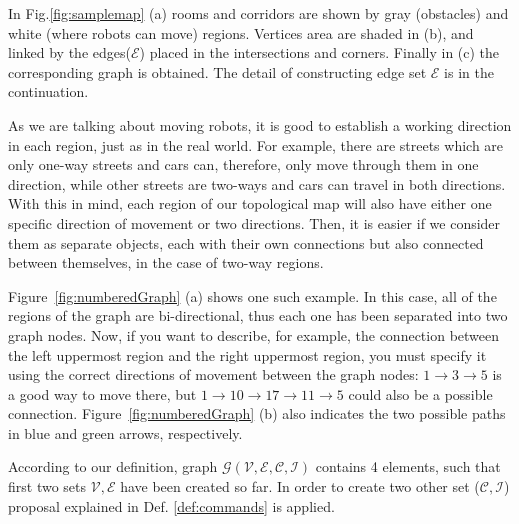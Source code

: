 \documentclass[twocolumn]{svjour3}       %
\begin{document}
%
In Fig.\ref{fig:samplemap} (a) rooms and corridors are shown by gray (obstacles) and white (where robots can move) regions. Vertices area are shaded in (b), and linked by the edges($\mathcal{E}$) placed in the intersections and corners. Finally in (c) the corresponding graph is obtained. The detail of constructing edge set $\mathcal{E}$ is in the continuation.

As we are talking about moving robots, it is good to establish a working direction in each region, just as in the real world. For example, there are streets which are only one-way streets and cars can, therefore, only move through them in one direction, while other streets are two-ways and cars can travel in both directions. With this in mind, each region of our topological map will also have either one specific direction of movement or two directions. Then, it is easier if we consider them as separate objects, each with their own connections but also connected between themselves, in the case of two-way regions.

Figure~\ref{fig:numberedGraph} (a) shows one such example. In this case, all of the regions of the graph are bi-directional, thus each one has been separated into two graph nodes. Now, if you want to describe, for example, the connection between the left uppermost region and the right uppermost region, you must specify it using the correct directions of movement between the graph nodes: $1 \rightarrow 3 \rightarrow 5$ is a good way to move there, but $1 \rightarrow 10 \rightarrow 17 \rightarrow 11 \rightarrow 5$ could also be a possible connection. Figure~\ref{fig:numberedGraph} (b) also indicates the two possible paths in blue and green arrows, respectively. 

According to our definition, graph $\mathcal{G}(\mathcal{V},\mathcal{E},\mathcal{C},\mathcal{I})$ contains 4 elements, such that first two sets $\mathcal{V},\mathcal{E}$ have been created so far. In order to create two other set ($\mathcal{C},\mathcal{I}$) proposal explained in Def. \ref{def:commands} is applied.
\end{document}
